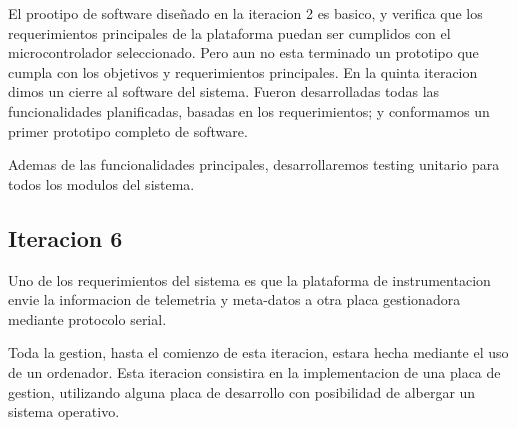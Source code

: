 El prootipo de software diseñado en la iteracion 2 es basico, y verifica que los requerimientos principales de la plataforma puedan ser cumplidos con el microcontrolador seleccionado. Pero aun no esta terminado un prototipo que cumpla con los objetivos y requerimientos principales. En la quinta iteracion dimos un cierre al software del sistema. Fueron desarrolladas todas las funcionalidades planificadas, basadas en los requerimientos; y conformamos un primer prototipo completo de software.

Ademas de las funcionalidades principales, desarrollaremos testing unitario para todos los modulos del sistema.


\subsection{Iteracion 6} %
\label{sub:iteracion_6}

Uno de los requerimientos del sistema es que la plataforma de instrumentacion envie la informacion de telemetria y meta-datos a otra placa gestionadora mediante protocolo serial. 

Toda la gestion, hasta el comienzo de esta iteracion, estara hecha mediante el uso de un ordenador. Esta iteracion consistira en la implementacion de una placa de gestion, utilizando alguna placa de desarrollo con posibilidad de albergar un sistema operativo.

